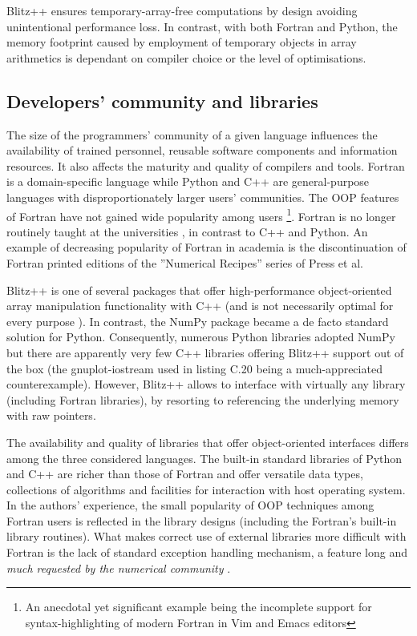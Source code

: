 \documentclass[twocolumn]{article}
\begin{document}
  Blitz++ ensures temporary-array-free computations by design
    \citep{Veldhuizen_et_al_1997} avoiding unintentional performance loss.
  In contrast, with both Fortran and Python, the memory footprint caused by employment
    of temporary objects in array arithmetics is dependant on compiler choice or
    the level of optimisations.

  \subsection{Developers' community and libraries}%

  The size of the programmers' community of a given language 
    influences the availability of trained personnel, 
    reusable software components and information resources.
  It also affects the maturity and quality of compilers and tools. 
  Fortran is a domain-specific language while Python and C++ are general-purpose languages
    with disproportionately larger users' communities.
  The OOP features of Fortran have not gained
    wide popularity among users \citep{Worth_2008}\footnote{An anecdotal yet significant
    example being the incomplete support for syntax-highlighting of modern Fortran in Vim and Emacs editors}.
  Fortran is no longer routinely taught at the universities \citep{Kendall_et_al_2008},
    in contrast to C++ and Python.
  An example of decreasing popularity of Fortran in academia 
    is the discontinuation of Fortran printed editions of the ''Numerical Recipes'' 
    series of Press et al.
 
  Blitz++ is one of several packages that offer high-performance object-oriented
    array manipulation functionality with C++ (and is not necessarily optimal for every
    purpose \citep{Iglberger_et_al_2012}).
  In contrast, the NumPy package became a de facto standard solution for Python.
  Consequently, numerous Python libraries adopted NumPy but
    there are apparently very few C++ libraries offering Blitz++ support out of the box
    (the gnuplot-iostream used in listing C.20 being a much-appreciated counterexample).
  However, Blitz++ allows to interface with virtually any library (including Fortran libraries), 
    by resorting to referencing the underlying memory with raw pointers.
 
  The availability and quality of libraries 
    that offer object-oriented interfaces
    differs among the three considered languages.
  The built-in standard libraries of Python and C++ are richer than
    those of Fortran and offer versatile data types, collections of
    algorithms and facilities for interaction with host operating system.
  In the authors' experience, the small popularity of OOP techniques among
    Fortran users is reflected in the library designs (including the Fortran's
    built-in library routines).
  What makes correct use of external libraries more difficult with Fortran
    is the lack of standard exception handling mechanism, a feature
    long and {\em much requested by the numerical community} \citep[][Foreword]{Press_et_al_1996}.
\end{document}
